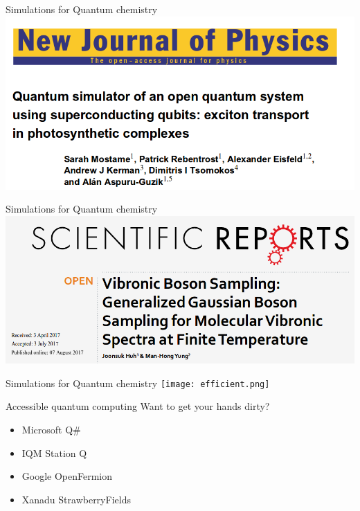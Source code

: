 \documentclass[10pt]{beamer}
\begin{document}
\begin{frame}{Simulations for Quantum chemistry}
\includegraphics[width=\textwidth]{photosynthesis.png}
\end{frame}

\begin{frame}{Simulations for Quantum chemistry}
    \includegraphics[width=\textwidth]{vibronic_boson_sampling.png}
\end{frame}

\begin{frame}{Simulations for Quantum chemistry}
     \texttt{[image: efficient.png]}
\end{frame}



\begin{frame}{Accessible quantum computing}
Want to get your hands dirty?
    \begin{itemize}
        \item Microsoft Q\# 
        \item IQM Station Q
        \item Google OpenFermion
        \item Xanadu StrawberryFields
    \end{itemize}
\end{frame}
\end{document}
